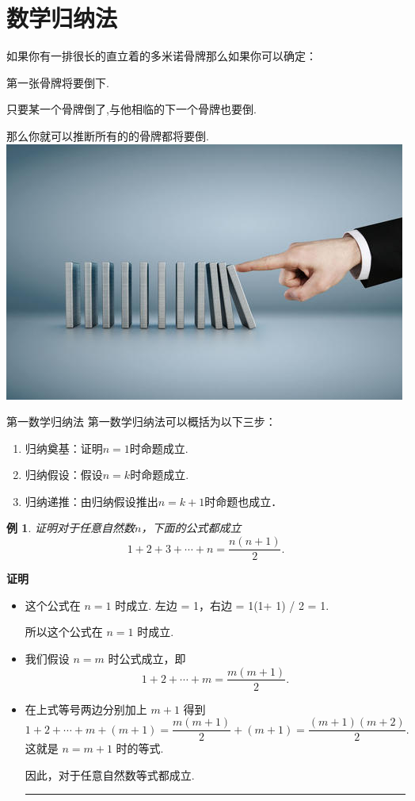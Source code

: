 \documentclass[13pt,fontset=mac]{ctexbeamer}
\newtheorem{exa}{例}
\def\qed{\nopagebreak\hfill{\rule{4pt}{7pt}}\medbreak}
\def\pf{{\bf 证明~~ }}
\begin{document}
\section{数学归纳法}

\begin{frame}


如果你有一排很长的直立着的多米诺骨牌那么如果你可以确定：

第一张骨牌将要倒下. 

只要某一个骨牌倒了,与他相临的下一个骨牌也要倒. 

那么你就可以推断所有的的骨牌都将要倒. \\[15pt]
		\includegraphics[scale=0.4]{gupai.jpg}
\end{frame}


\begin{frame}{第一数学归纳法}
第一数学归纳法可以概括为以下三步：
\begin{enumerate}
	
\item 归纳奠基：证明$n=1$时命题成立. 
\item 归纳假设：假设$n=k$时命题成立.
\item 归纳递推：由归纳假设推出$n=k+1$时命题也成立．
\end{enumerate}
\end{frame}

\begin{frame}
\begin{exa}
证明对于任意自然数$n$，下面的公式都成立
\[
1+2+3+\cdots+n=\frac{n(n+1)}{2}.
\]
\end{exa}

\pf 
\begin{itemize}
\item 这个公式在 $n=1$ 时成立.  左边 = 1，右边 = 1(1+ 1) / 2 = 1. 

所以这个公式在 $n=1$ 时成立. 
\item 我们假设 $n=m$ 时公式成立，即
\[
1+2+\cdots+m=\frac{m(m+1)}{2}.
\]
\item 在上式等号两边分别加上 $m+1$ 得到
\[
1+2+\cdots+m+(m+1)=\frac{m(m+1)}{2}+(m+1) = \frac{(m+1)(m+2)}{2}.
\]
这就是 $n=m+1$ 时的等式. 

因此，对于任意自然数等式都成立. \qed
\end{itemize}
\end{frame}
\end{document}
